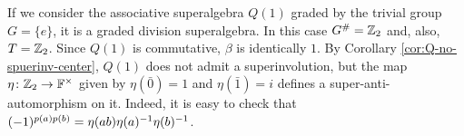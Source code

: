     


\begin{ex}
    If we consider the associative superalgebra $Q(1)$ graded by the trivial group $G = \{e\}$, it is a graded division superalgebra. 
    In this case $G^\# = \mathbb{Z}_2$ and, also, $T = \mathbb{Z}_2$. 
    Since $Q(1)$ is commutative, $\beta$ is identically $1$.
    By Corollary \ref{cor:Q-no-spuerinv-center}, $Q(1)$ does not admit a superinvolution, but the map $\eta\colon \mathbb{Z}_2 \to \mathbb{F}^\times$ given by $\eta (\bar 0) = 1$ and $\eta( \bar 1) = i$ defines a super-anti-automorphism on it. 
    Indeed, it is easy to check that $(-1)^{p(a) p(b)} =  \eta(ab) \eta(a)^{-1} \eta(b)^{-1}$.
\end{ex}

